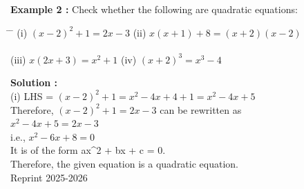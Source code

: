 \documentclass[12pt]{article}
\begin{document}
\vspace{0.4em}
\hspace{-6em}
\textbf{\color{cyanblue}Example 2 :} Check whether the following are quadratic equations:
\begin{tabbing}
\hspace{3cm} \= \hspace{6.5cm} \= \kill
\>(i) $(x - 2)^2 + 1 = 2x - 3$ \> (ii) $x(x + 1) + 8 = (x + 2)(x - 2)$ \\
\\
\>(iii) $x(2x + 3) = x^2 + 1$ \> (iv) $(x + 2)^3 = x^3 - 4$
\end{tabbing}
\vspace{0.5em}
\hspace{-28em}
\textbf{\color{cyanblue}Solution :}
\\
\hspace{-10em}(i) LHS = $(x - 2)^2 + 1 = x^2 - 4x + 4 + 1 = x^2 - 4x + 5$\\
\vspace{0.4em}
\hspace*{-11em} Therefore, $(x - 2)^2 + 1 = 2x - 3$ can be rewritten as\\
\vspace{0.4em}
\hspace*{-3em} $x^2 - 4x + 5 = 2x - 3$\\
\vspace{0.4em}
\hspace{-16em} i.e., \hspace{7em}\quad $x^2 - 6x + 8 = 0$\\
\vspace{0.4em}
\hspace{-18em}It is of the form  ax^2 + bx + c = 0.\\
\vspace{0.4em}
\hspace{-10em}Therefore, the given equation is a quadratic equation.\\
\vspace*{5em}
\centering
Reprint 2025-2026
\end{document}
